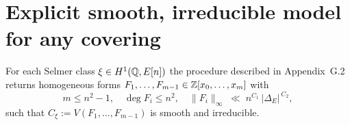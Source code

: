 \section{Explicit smooth, irreducible model for any covering}\label{BSD:smooth}

\begin{theorem}\label{thm:smooth}
For each Selmer class $\xi\in H^{1}(\Bbb Q,E[n])$ the procedure
 described in Appendix~G.2 returns homogeneous forms
$F_{1},\dots,F_{m-1}\in\Bbb Z[x_{0},\dots,x_{m}]$ with
\[
 m\le n^{2}-1,\quad
 \deg F_{i}\le n^{2},
 \quad
 \|F_{i}\|_{\infty}\;\ll\;
 n^{C_{1}}\,|\Delta_{E}|^{\,C_{2}},
\]
such that $C_{\xi}:=V(F_{1},\dots,F_{m-1})$ is smooth and irreducible.
\end{theorem} 